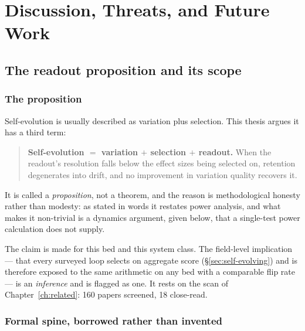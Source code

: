\chapter{Discussion, Threats, and Future Work}
\label{ch:discussion}


\section{The readout proposition and its scope}
\label{sec:proposition}

\subsection*{The proposition}

Self-evolution is usually described as variation plus selection. This
thesis argues it has a third term:

\begin{quote}
\textbf{Self-evolution $=$ variation $+$ selection $+$ readout.} When the
readout's resolution falls below the effect sizes being selected on,
retention degenerates into drift, and no improvement in variation quality
recovers it.
\end{quote}

It is called a \emph{proposition}, not a theorem, and the reason is
methodological honesty rather than modesty: as stated in words it restates
power analysis, and what makes it non-trivial is a dynamics argument, given
below, that a single-test power calculation does not supply.

The claim is made for this bed and this system class. The field-level
implication --- that every surveyed loop selects on aggregate score
(\S\ref{sec:self-evolving}) and is therefore exposed to the same
arithmetic on any bed with a comparable flip rate --- is an \emph{inference}
and is flagged as one. It rests on the scan of Chapter~\ref{ch:related}:
160 papers screened, 18 close-read.

\subsection*{Formal spine, borrowed rather than invented}

